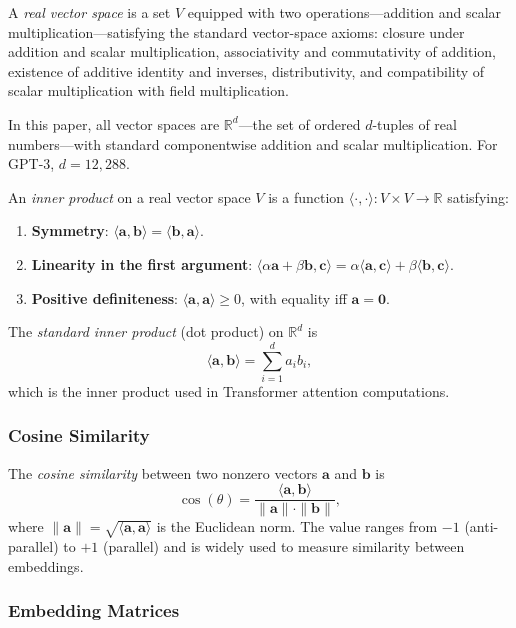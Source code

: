 \documentclass[a4paper,twocolumn,11pt]{article}
\begin{document}
A \emph{real vector space} is a set $V$ equipped with two operations---addition and scalar multiplication---satisfying the standard vector-space axioms: closure under addition and scalar multiplication, associativity and commutativity of addition, existence of additive identity and inverses, distributivity, and compatibility of scalar multiplication with field multiplication.

In this paper, all vector spaces are $\mathbb{R}^d$---the set of ordered $d$-tuples of real numbers---with standard componentwise addition and scalar multiplication. For GPT-3, $d = 12{,}288$.

An \emph{inner product} on a real vector space $V$ is a function $\langle \cdot,\cdot \rangle : V \times V \to \mathbb{R}$ satisfying:
\begin{enumerate}[noitemsep]
\item \textbf{Symmetry}: $\langle \mathbf{a}, \mathbf{b} \rangle = \langle \mathbf{b}, \mathbf{a} \rangle$.
\item \textbf{Linearity in the first argument}: $\langle \alpha \mathbf{a} + \beta \mathbf{b}, \mathbf{c} \rangle = \alpha \langle \mathbf{a}, \mathbf{c} \rangle + \beta \langle \mathbf{b}, \mathbf{c} \rangle$.
\item \textbf{Positive definiteness}: $\langle \mathbf{a}, \mathbf{a} \rangle \geq 0$, with equality iff $\mathbf{a} = \mathbf{0}$.
\end{enumerate}
The \emph{standard inner product} (dot product) on $\mathbb{R}^d$ is
\[
\langle \mathbf{a}, \mathbf{b} \rangle = \sum_{i=1}^{d} a_i b_i,
\]
which is the inner product used in Transformer attention computations.

\subsubsection*{Cosine Similarity}

The \emph{cosine similarity} between two nonzero vectors $\mathbf{a}$ and $\mathbf{b}$ is
\[
\cos(\theta) = \frac{\langle \mathbf{a}, \mathbf{b} \rangle}{\|\mathbf{a}\| \cdot \|\mathbf{b}\|},
\]
where $\|\mathbf{a}\| = \sqrt{\langle \mathbf{a}, \mathbf{a} \rangle}$ is the Euclidean norm. The value ranges from $-1$ (anti-parallel) to $+1$ (parallel) and is widely used to measure similarity between embeddings.

\subsubsection*{Embedding Matrices}
\end{document}
